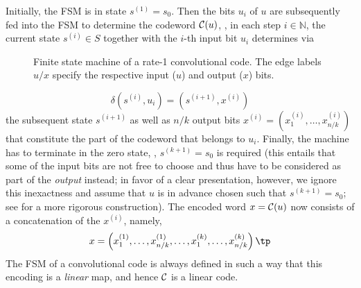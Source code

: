 Initially, the FSM is in state $s^{(1)} = s_0$. Then the bits $u_i$ of $u$ are subsequently fed into the FSM to determine the codeword $\mathcal{C}(u)$, \ie, in each step $i ∈ ℕ$, the  current state $s^{(i)} ∈ S$ together with the $i$-th input bit $u_i$ determines via
\begin{figure}
  \centering
  \caption{Finite state machine of a rate-1 convolutional code. The edge labels $u/x$ specify the respective input ($u$) and output ($x$) bits.}
  \label{fig:example-fsm}
\end{figure}
\begin{equation*}
  δ(s^{(i)}, u_i) = (s^{(i+1)}, x^{(i)})
\end{equation*}
the subsequent state $s^{(i+1)}$ as well as $n/k$ output bits $x^{(i)} = (x^{(i)}_1,\dotsc,x^{(i)}_{n/k})$ that constitute the part of the codeword that belongs to $u_i$. Finally, the machine has to terminate in the zero state, \ie, $s^{(k+1)} = s_0$ is required (this entails that some of the input bits are not free to choose and thus have to be considered as part of the \emph{output} instead; in favor of a clear presentation, however, we ignore this inexactness and assume that $u$ is in advance chosen such that $s^{(k+1)} = s_0$; see \eg \cite{HelmlingRuzika13CombinatorialTurbo} for a more rigorous construction). The encoded word $x = \mathcal{C}(u)$ now consists of a concatenation of the $x^{(i)}$, namely,
\[ x = \left(x^{(1)}_1,\dotsc, x^{(1)}_{n/k},\dotsc, x^{(k)}_1,\dotsc,x^{(k)}_{n/k}\right)\tp \]
The FSM of a convolutional code is always defined in such a way that this encoding is a \emph{linear} map, and hence $\mathcal{C}$ is a linear code.

